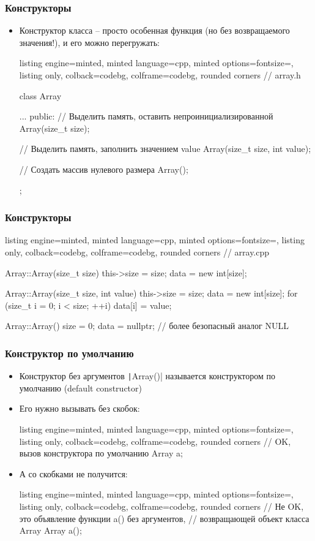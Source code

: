 \documentclass[10pt]{beamer}
\begin{document}
\begin{frame}[fragile]
\frametitle{Конструкторы}
\begin{itemize}
\item Конструктор класса -- просто особенная функция (но без возвращаемого значения!), и его можно перегружать:
\begin{tcblisting}{listing engine=minted, minted language=cpp, minted options={fontsize=\scriptsize}, listing only, colback=codebg, colframe=codebg, rounded corners}
// array.h

class Array {
...
public:
  // Выделить память, оставить непроинициализированной
  Array(size_t size);

  // Выделить память, заполнить значением value
  Array(size_t size, int value);

  // Создать массив нулевого размера
  Array();
};
\end{tcblisting}
\end{itemize}
\end{frame}

\begin{frame}[fragile]
\frametitle{Конструкторы}
\begin{tcblisting}{listing engine=minted, minted language=cpp, minted options={fontsize=\scriptsize}, listing only, colback=codebg, colframe=codebg, rounded corners}
// array.cpp

Array::Array(size_t size) {
  this->size = size;
  data = new int[size];
}

Array::Array(size_t size, int value) {
  this->size = size;
  data = new int[size];
  for (size_t i = 0; i < size; ++i)
    data[i] = value;
}

Array::Array() {
  size = 0;
  data = nullptr; // более безопасный аналог NULL
}
\end{tcblisting}
\end{frame}

\begin{frame}[fragile]
\frametitle{Конструктор по умолчанию}
\begin{itemize}
\item Конструктор без аргументов \texttt|Array()| называется конструктором по умолчанию (default constructor)
\pause
{}
\item Его нужно вызывать без скобок:
\begin{tcblisting}{listing engine=minted, minted language=cpp, minted options={fontsize=\scriptsize}, listing only, colback=codebg, colframe=codebg, rounded corners}
// OK, вызов конструктора по умолчанию
Array a;
\end{tcblisting}
\pause
\item А со скобками не получится:
\begin{tcblisting}{listing engine=minted, minted language=cpp, minted options={fontsize=\scriptsize}, listing only, colback=codebg, colframe=codebg, rounded corners}
// Не OK, это объявление функции a() без аргументов,
// возвращающей объект класса Array
Array a();
\end{tcblisting}
\end{itemize}
\end{frame}
\end{document}
